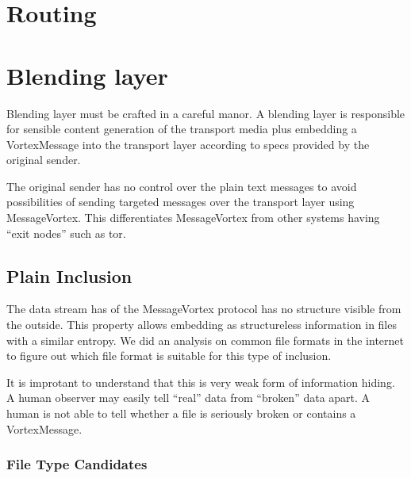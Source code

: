 
\section{Routing}

\section{Blending layer}
Blending layer must be crafted in a careful manor. A blending layer is responsible for sensible content generation of the transport media plus embedding a VortexMessage into the transport layer according to specs provided by the original sender.

The original sender has no control over the plain text messages to avoid possibilities of sending targeted messages over the transport layer using MessageVortex. This differentiates MessageVortex from other systems having ``exit nodes'' such as tor.


\subsection{Plain Inclusion}
The data stream has of the MessageVortex protocol has no structure visible from the outside. This property allows embedding as structureless information in files with a similar entropy. We did an analysis on common file formats in the internet to figure out which file format is suitable for this type of inclusion.

It is improtant to understand that this is very weak form of information hiding. A human observer may easily tell ``real'' data from ``broken'' data apart. A human is not able to tell whether a file is seriously broken or contains a VortexMessage.

\subsubsection{File Type Candidates}

